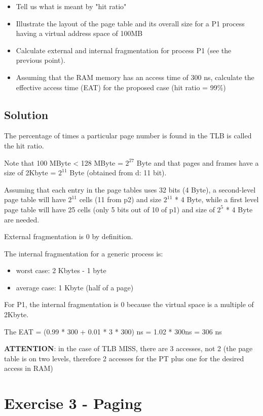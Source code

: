 \begin{itemize}
\item Tell us what is meant by "hit ratio"
\item	Illustrate the layout of the page table and its overall size for a P1 process having a virtual address space of 100MB
\item Calculate external and internal fragmentation for process P1 (see the previous point).
\item Assuming that the RAM memory has an access time of 300 ns, calculate the effective access time (EAT) for the proposed case (hit ratio = 99\%)
\end{itemize}


\subsection{Solution}

The percentage of times a particular page number is found in the TLB is called the hit ratio. 

Note that 100 MByte < 128 MByte = $2^27$ Byte and that pages and frames have a size of 2Kbyte = $2^{11}$ Byte (obtained from d: 11 bit). 

Assuming that each entry in the page tables uses 32 bits (4 Byte), a second-level page table will have $2^{11}$ cells (11 from p2) and size $2^{11}$ * 4 Byte, while a first level page table will have 25 cells (only 5 bits out of 10 of p1) and size of $2^5$ * 4 Byte are needed. 

External fragmentation is 0 by definition. 

The internal fragmentation for a generic process is:
\begin{itemize}
 \item worst case: 2 Kbytes - 1 byte
 \item average case: 1 Kbyte (half of a page)
\end{itemize}

For P1, the internal fragmentation is 0 because the virtual space is a multiple of 2Kbyte.

The	EAT = (0.99 * 300 + 0.01 * 3 * 300) ns = 1.02 * 300ns = 306 ns

\textbf{ATTENTION}: in the case of TLB MISS, there are 3 accesses, not 2 (the page table is on two levels, therefore 2 accesses for the PT plus one for the desired access in RAM)

\section{Exercise 3 - Paging}

